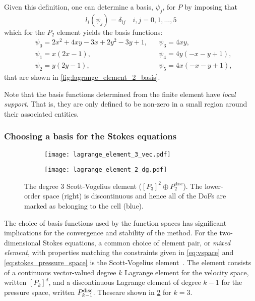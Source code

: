 \documentclass[thesis]{subfiles}
\begin{document}
Given this definition, one can determine a basis, $\psi_j$, for $P$ by imposing that
\begin{equation*}
  l_i(\psi_j) = \delta_{ij} \quad i, j = 0, 1, \dots, 5
\end{equation*}
which for the $P_2$ element yields the basis functions:
\begin{align*}
  &\psi_0 = 2x^2 + 4xy - 3x + 2y^2-3y+1,
  &
  &\psi_3 = 4xy, \\
  &\psi_1 = x(2x-1),
  &
  &\psi_4 = 4y(-x-y+1), \\
  &\psi_2 = y(2y-1),
  &
  &\psi_5 = 4x(-x-y+1),
\end{align*}
that are shown in \cref{fig:lagrange_element_2_basis}.

Note that the basis functions determined from the finite element have \emph{local support}.
That is, they are only defined to be non-zero in a small region around their associated entities.

\subsubsection{Choosing a basis for the Stokes equations}

\begin{figure}
  \centering
  \begin{subfigure}{.35\textwidth}
    \centering
    \texttt{[image: lagrange\_element\_3\_vec.pdf]}
    \label{fig:scott_vogelius_element_P3}
  \end{subfigure}
  \begin{subfigure}{.35\textwidth}
    \centering
    \texttt{[image: lagrange\_element\_2\_dg.pdf]}
  \end{subfigure}
  \caption{
    The degree 3 Scott-Vogelius element ($[P_3]^2 \oplus P_2^\mathrm{disc}$).
    The lower-order space (right) is discontinuous and hence all of the DoFs are marked as belonging to the cell (blue).
  }
  \label{fig:scott_vogelius_element}
\end{figure}

The choice of basis functions used by the function spaces has significant implications for the convergence and stability of the method.
For the two-dimensional Stokes equations, a common choice of element pair, or \emph{mixed element}, with properties matching the constraints given in \cref{eq:vspace} and \cref{eq:stokes_pressure_space} is the Scott-Vogelius element~\cite{scottNormEstimatesMaximal1985}.
The element consists of a continuous vector-valued degree $k$ Lagrange element for the velocity space, written $[P_k]^d$, and a discontinuous Lagrange element of degree $k-1$ for the pressure space, written $P_{k-1}^{\textnormal{disc}}$.
These\footnotemark are shown in \cref{fig:scott_vogelius_element} for $k = 3$.
\end{document}
